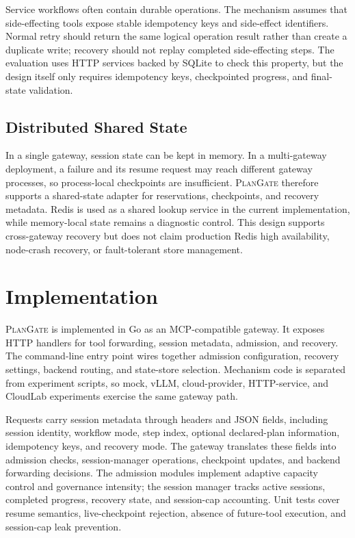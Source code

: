 \documentclass[5p,times]{elsarticle}
\newcommand{\plangate}{\textsc{PlanGate}\xspace}
\begin{document}
Service workflows often contain durable operations. The mechanism assumes that side-effecting tools expose stable idempotency keys and side-effect identifiers. Normal retry should return the same logical operation result rather than create a duplicate write; recovery should not replay completed side-effecting steps. The evaluation uses HTTP services backed by SQLite to check this property, but the design itself only requires idempotency keys, checkpointed progress, and final-state validation.

\subsection{Distributed Shared State}

In a single gateway, session state can be kept in memory. In a multi-gateway deployment, a failure and its resume request may reach different gateway processes, so process-local checkpoints are insufficient. \plangate therefore supports a shared-state adapter for reservations, checkpoints, and recovery metadata. Redis is used as a shared lookup service in the current implementation, while memory-local state remains a diagnostic control. This design supports cross-gateway recovery but does not claim production Redis high availability, node-crash recovery, or fault-tolerant store management.

\section{Implementation}
\label{sec:implementation}

\plangate is implemented in Go as an MCP-compatible gateway. It exposes HTTP handlers for tool forwarding, session metadata, admission, and recovery. The command-line entry point wires together admission configuration, recovery settings, backend routing, and state-store selection. Mechanism code is separated from experiment scripts, so mock, vLLM, cloud-provider, HTTP-service, and CloudLab experiments exercise the same gateway path.

Requests carry session metadata through headers and JSON fields, including session identity, workflow mode, step index, optional declared-plan information, idempotency keys, and recovery mode. The gateway translates these fields into admission checks, session-manager operations, checkpoint updates, and backend forwarding decisions. The admission modules implement adaptive capacity control and governance intensity; the session manager tracks active sessions, completed progress, recovery state, and session-cap accounting. Unit tests cover resume semantics, live-checkpoint rejection, absence of future-tool execution, and session-cap leak prevention.
\end{document}
